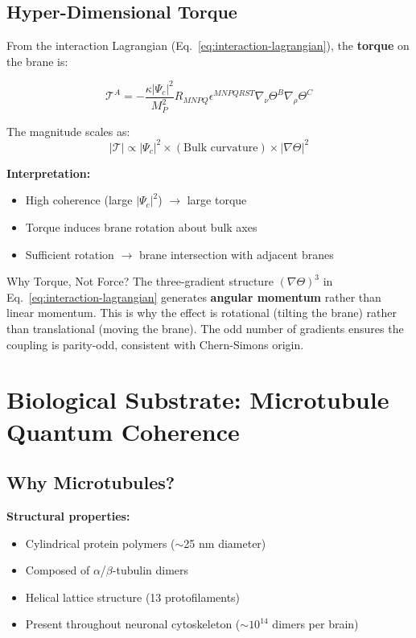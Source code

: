 \subsection{Hyper-Dimensional Torque}
\label{subsec:torque}

From the interaction Lagrangian (Eq.~\eqref{eq:interaction-lagrangian}), the \textbf{torque} on the brane is:

\begin{equation}
\label{eq:torque}
\mathcal{T}^A = -\frac{\kappa|\Psi_c|^2}{M_P^2} R_{MNPQ} \epsilon^{MNPQRST} \nabla_\nu\Theta^B \nabla_\rho\Theta^C
\end{equation}

The magnitude scales as:
\begin{equation}
\label{eq:torque-magnitude}
|\mathcal{T}| \propto |\Psi_c|^2 \times (\text{Bulk curvature}) \times |\nabla\Theta|^2
\end{equation}

\textbf{Interpretation:}
\begin{itemize}
\item High coherence (large $|\Psi_c|^2$) $\rightarrow$ large torque
\item Torque induces brane rotation about bulk axes
\item Sufficient rotation $\rightarrow$ brane intersection with adjacent branes
\end{itemize}

\begin{calloutbox}{Why Torque, Not Force?}
The three-gradient structure $(\nabla\Theta)^3$ in Eq.~\eqref{eq:interaction-lagrangian} generates \textbf{angular momentum} rather than linear momentum. This is why the effect is rotational (tilting the brane) rather than translational (moving the brane). The odd number of gradients ensures the coupling is parity-odd, consistent with Chern-Simons origin.
\end{calloutbox}

\section{Biological Substrate: Microtubule Quantum Coherence}
\label{sec:microtubules}

\subsection{Why Microtubules?}
\label{subsec:why-microtubules}

\textbf{Structural properties:}
\begin{itemize}
\item Cylindrical protein polymers ($\sim$25 nm diameter)
\item Composed of $\alpha$/$\beta$-tubulin dimers
\item Helical lattice structure (13 protofilaments)
\item Present throughout neuronal cytoskeleton ($\sim 10^{14}$ dimers per brain)
\end{itemize}


